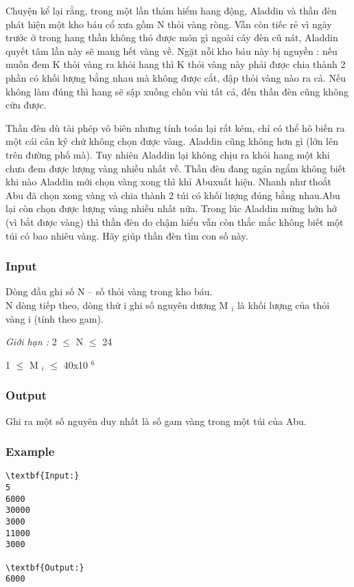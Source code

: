 

Chuyện kể lại rằng, trong một lần thám hiểm hang động, Aladdin và thần đèn phát hiện một kho báu cổ xưa gồm N thỏi vàng ròng. Vẫn còn tiếc rẻ vì ngày trước ở trong hang thần không thó được món gì ngoài cây đèn cũ nát, Aladdin quyết tâm lần này sẽ mang hết vàng về. Ngặt nỗi kho báu này bị nguyền : nếu muốn đem K thỏi vàng ra khỏi hang thì K thỏi vàng này phải được chia thành 2 phần có khối lượng bằng nhau mà không được cắt, đập thỏi vàng nào ra cả. Nếu không làm đúng thì hang sẽ sập xuống chôn vùi tất cả, đến thần đèn cũng không cứu được.

Thần đèn dù tài phép vô biên nhưng tính toán lại rất kém, chỉ có thể hô biến ra một cái cân ký chứ không chọn được vàng. Aladdin cũng không hơn gì (lớn lên trên đường phố mà). Tuy nhiên Aladdin lại không chịu ra khỏi hang một khi chưa đem được lượng vàng nhiều nhất về. Thần đèn đang ngán ngẩm không biết khi nào Aladdin mới chọn vàng xong thì khỉ Abuxuất hiện. Nhanh như thoắt Abu đã chọn xong vàng và chia thành 2 túi có khối lượng đúng bằng nhau.Abu lại còn chọn được lượng vàng nhiều nhất nữa. Trong lúc Aladdin mừng hớn hở (vì bắt được vàng) thì thần đèn do chậm hiểu vẫn còn thắc mắc không biết một túi có bao nhiêu vàng. Hãy giúp thần đèn tìm con số này.

\subsubsection{Input}

Dòng đầu ghi số N – số thỏi vàng trong kho báu.
\\N dòng tiếp theo, dòng thứ i ghi số nguyên dương M $_ i $ là khối lượng của thỏi vàng i (tính theo gam).

\emph{Giới hạn : } 2  $\le$  N  $\le$  24

1  $\le$  M $_ i $  $\le$  40x10 $^ 6 $

\subsubsection{Output}

Ghi ra một số nguyên duy nhất là số gam vàng trong một túi của Abu.

\subsubsection{Example}
\begin{verbatim}
\textbf{Input:}
5
6000
30000
3000
11000
3000

\textbf{Output:}
6000\end{verbatim}
